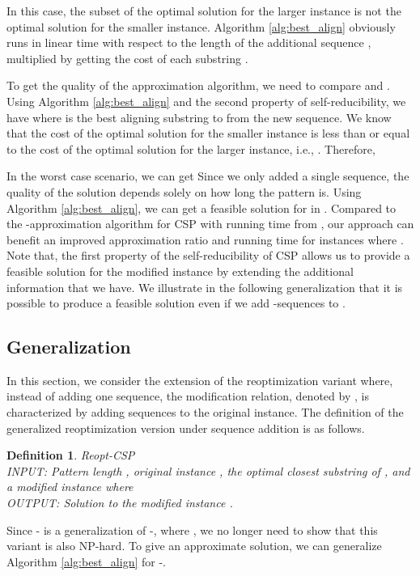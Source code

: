 \documentclass[journal]{acm_proc_article-sp}
\newtheorem{definition}{Definition}
\begin{document}
In this case, the subset of the optimal solution for the larger instance is not the optimal solution for the smaller instance.  Algorithm \ref{alg:best_align} obviously runs in linear time with respect to the length of the additional sequence , multiplied by getting the cost of each substring . 





To get the quality of the approximation algorithm, we need to compare  and . Using Algorithm \ref{alg:best_align} and the second property of self-reducibility, we have
 where  is the best aligning substring to  from the new sequence. We know that the cost of the optimal solution for the smaller instance is less than or equal to the cost of the optimal solution for the larger instance, i.e., . Therefore,

In the worst case scenario, we can get  
Since we only added a single sequence, the quality of the solution depends solely on how long the pattern is.  Using Algorithm \ref{alg:best_align}, we can get  a feasible solution for  in . Compared to the -approximation algorithm for CSP with running time  from \cite{Lanctot1998}, our approach can benefit an improved approximation ratio and running time for instances  where .
Note that, the first property of the self-reducibility of CSP allows us to provide a feasible solution for the modified instance by extending the additional information that we have. We illustrate in the following generalization that it is possible to produce a feasible solution even if we add -sequences to . 
 




\subsection{Generalization}
In this section, we consider the extension of the reoptimization variant where, instead of adding one sequence, the modification relation, denoted by , is characterized by adding  sequences to the original instance. The definition of the generalized reoptimization version under sequence addition is as follows.
\begin{definition}{Reopt-CSP} \ \\ INPUT: Pattern length , original instance , the optimal closest substring  of , and a modified instance  where \\
\noindent OUTPUT: Solution  to the modified instance .
\end{definition}
Since - is a generalization of -, where , we no longer need to show that this variant is also NP-hard. To give an approximate solution, we  can generalize Algorithm \ref{alg:best_align} for -. 
\end{document}
